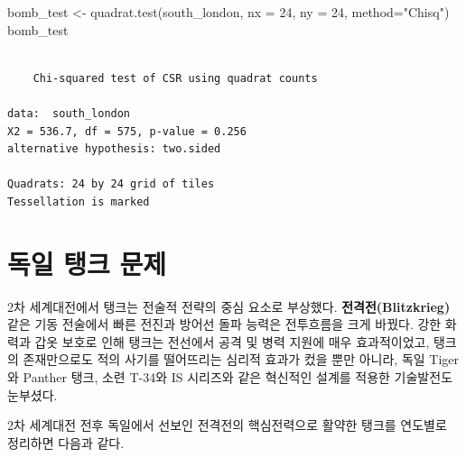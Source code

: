 \documentclass[
  letterpaper,
  chapter,a4paper,showtrims,openright,hidelinks]{oblivoir}
\newenvironment{Shaded}{\begin{snugshade}}{\end{snugshade}}
\newcommand{\AttributeTok}[1]{\textcolor[rgb]{0.40,0.45,0.13}{#1}}
\newcommand{\DecValTok}[1]{\textcolor[rgb]{0.68,0.00,0.00}{#1}}
\newcommand{\FunctionTok}[1]{\textcolor[rgb]{0.28,0.35,0.67}{#1}}
\newcommand{\NormalTok}[1]{\textcolor[rgb]{0.00,0.23,0.31}{#1}}
\newcommand{\OtherTok}[1]{\textcolor[rgb]{0.00,0.23,0.31}{#1}}
\newcommand{\StringTok}[1]{\textcolor[rgb]{0.13,0.47,0.30}{#1}}
\begin{document}
\begin{Shaded}
\begin{Highlighting}[]
\NormalTok{bomb\_test }\OtherTok{\textless{}{-}} \FunctionTok{quadrat.test}\NormalTok{(south\_london, }\AttributeTok{nx =} \DecValTok{24}\NormalTok{, }\AttributeTok{ny =} \DecValTok{24}\NormalTok{, }\AttributeTok{method=}\StringTok{"Chisq"}\NormalTok{)}
\NormalTok{bomb\_test}
\end{Highlighting}
\end{Shaded}

\begin{verbatim}

    Chi-squared test of CSR using quadrat counts

data:  south_london
X2 = 536.7, df = 575, p-value = 0.256
alternative hypothesis: two.sided

Quadrats: 24 by 24 grid of tiles
Tessellation is marked
\end{verbatim}

\hypertarget{uxb3c5uxc77c-uxd0f1uxd06c-uxbb38uxc81c}{%
\chapter{독일 탱크 문제}\label{uxb3c5uxc77c-uxd0f1uxd06c-uxbb38uxc81c}}

2차 세계대전에서 탱크는 전술적 전략의 중심 요소로 부상했다.
\textbf{전격전(Blitzkrieg)} 같은 기동 전술에서 빠른 전진과 방어선 돌파
능력은 전투흐름을 크게 바꿨다. 강한 화력과 갑옷 보호로 인해 탱크는
전선에서 공격 및 병력 지원에 매우 효과적이었고, 탱크의 존재만으로도 적의
사기를 떨어뜨리는 심리적 효과가 컸을 뿐만 아니라, 독일 Tiger와 Panther
탱크, 소련 T-34와 IS 시리즈와 같은 혁신적인 설계를 적용한 기술발전도
눈부셨다.

2차 세계대전 전후 독일에서 선보인 전격전의 핵심전력으로 활약한 탱크를
연도별로 정리하면 다음과 같다.
\end{document}
